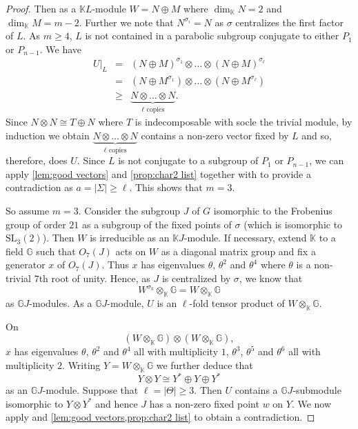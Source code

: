 \documentclass[12pt]{amsart}
\theoremstyle{remark}
\theoremstyle{notation}
\theoremstyle{definition}
\newcommand{\SL}{\mathrm{SL}}
\newcommand{\0}{\emptyset}
\begin{document}
\begin{proof}
Then as a $\mathbb KL$-module   $W= N\oplus M$ where $\dim_{\mathbb K} N=2$ and $\dim_{\mathbb K} M= m-2$.  Further we note that $N^{\sigma_i}=N$ as $\sigma$ centralizes the first factor of $L$. As $m\ge 4$, $L$ is not contained in a parabolic subgroup conjugate to either $P_1$ or $P_{n-1}$. We have \begin{eqnarray*} U|_L&=&
 (N\oplus M) ^{\sigma_1}\otimes
 \dots\otimes (N\oplus M) ^{\sigma_{\ell}}\\&=&
 (N\oplus M ^{\sigma_1})\otimes
 \dots\otimes (N\oplus M ^{\sigma_{\ell}})\\
 &\ge& \underbrace{N\otimes \dots \otimes N}_{\ell \text{ copies}}.
\end{eqnarray*}
  Since $N \otimes N \cong T\oplus N$ where $T$ is indecomposable with   socle the trivial module,  by induction we obtain $\underbrace{N\otimes \dots \otimes N}_{\ell \text{ copies}}$ contains a non-zero vector fixed by $L$ and so, therefore, does $U$. Since $L$ is not   conjugate to a subgroup  of $P_1$ or $P_{n-1}$,
 we can apply \cref{lem:good vectors} and \cref{prop:char2 list} together with \cite[Theorem A, Tables 1, 2 \& 3]{LiebeckPraegerSaxl}  to  provide a contradiction as $a=|\Sigma| \ge \ell$. This shows that $m= 3$.

 So assume $m=3$. Consider the subgroup $J $ of $G$ isomorphic to the Frobenius group of order $21$ as a subgroup of the fixed points of $\sigma$ (which is isomorphic to $\SL_3(2)$).  Then $W$ is   irreducible as an $\mathbb K J$-module. If necessary, extend $\mathbb K$ to a field $\mathbb G$ such that $O_7(J)$ acts on $W$ as a diagonal matrix group and fix a generator $x$ of $O_7(J)$. Thus $x$ has eigenvalues $\theta$, $\theta ^2$ and $\theta^4$ where $\theta$ is a non-trivial $7$th root of unity. Hence, as $J$ is centralized by $\sigma$, we know that $$W^{\sigma_k}\otimes_{\mathbb K}\mathbb G = W \otimes_{\mathbb K}\mathbb G$$ as  $\mathbb G J$-modules.  As a $\mathbb G J$-module, $U$ is an $\ell$-fold tensor product of $ W \otimes_{\mathbb K}\mathbb G$.


On $$(W\otimes_{\mathbb K}\mathbb G) \otimes (W\otimes_{\mathbb K}\mathbb G),$$ $x$ has eigenvalues $\theta$, $\theta^2$ and $\theta^4$ all with multiplicity $1$, $\theta^3$, $\theta^5$ and $\theta^6$ all with multiplicity $2$. Writing $Y= W\otimes_{\mathbb K}\mathbb G$ we further deduce that $$Y\otimes Y\cong Y^*\oplus Y \oplus Y^*$$ as an $\mathbb GJ$-module. Suppose that $\ell=|\Theta| \ge 3$. Then $U$ contains a $\mathbb GJ$-submodule isomorphic to $Y \otimes Y^*$ and hence $J$ has a non-zero fixed point $w $ on $Y$. We now apply \cite[Theorem A, Tables 1, 2 \& 3]{LiebeckPraegerSaxl} and \cref{lem:good vectors,prop:char2 list} to obtain a contradiction.




\end{proof}
\end{document}
